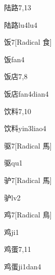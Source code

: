 \begin{entry}{陆路}{7,13}
  \begin{phonetics}{陆路}{lu4lu4}
  \end{phonetics}
\end{entry}

\begin{entry}{饭}{7}[Radical 食]
  \begin{phonetics}{饭}{fan4}
  \end{phonetics}
\end{entry}

\begin{entry}{饭店}{7,8}
  \begin{phonetics}{饭店}{fan4dian4}
  \end{phonetics}
\end{entry}

\begin{entry}{饮料}{7,10}
  \begin{phonetics}{饮料}{yin3liao4}
  \end{phonetics}
\end{entry}

\begin{entry}{驱}{7}[Radical 馬]
  \begin{phonetics}{驱}{qu1}
  \end{phonetics}
\end{entry}

\begin{entry}{驴}{7}[Radical 馬]
  \begin{phonetics}{驴}{lv2}
  \end{phonetics}
\end{entry}

\begin{entry}{鸡}{7}[Radical 鳥]
  \begin{phonetics}{鸡}{ji1}
  \end{phonetics}
\end{entry}

\begin{entry}{鸡蛋}{7,11}
  \begin{phonetics}{鸡蛋}{ji1dan4}
  \end{phonetics}
\end{entry}

